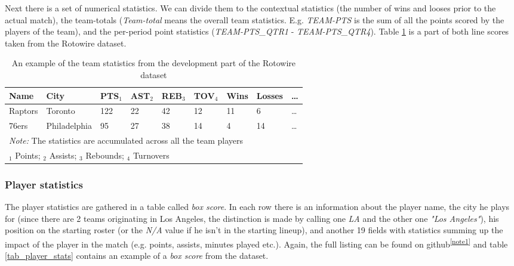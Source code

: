 Next there is a set of numerical statistics. We can divide them to the contextual statistics (the number of wins and looses prior to the actual match), the team-totals (\emph{Team-total} means the overall team statistics. E.g. \emph{TEAM-PTS} is the sum of all the points scored by the players of the team), and the per-period point statistics (\emph{TEAM-PTS\_QTR1} - \emph{TEAM-PTS\_QTR4}). Table \ref{tab_team_stats} is a part of both line scores taken from the Rotowire dataset.

\begin{table}[bh!]
    \centering
    \begin{tabular}{lllllllll}
        \toprule
        Name    & City         & PTS$_1$ & AST$_2$ & REB$_3$ & TOV$_4$ & Wins & Losses  &\dots \\
        \midrule
        Raptors & Toronto      & 122 & 22  & 42  & 12  & 11   & 6       &\dots \\
        76ers   & Philadelphia & 95  & 27  & 38  & 14  & 4    & 14     &\dots \\
        \bottomrule
        \multicolumn{9}{l}{\footnotesize \textit{Note:} The statistics are accumulated across all the team players} \\
        \multicolumn{9}{l}{\footnotesize $_1$ Points; $_2$ Assists; $_3$ Rebounds; $_4$ Turnovers}    \end{tabular}
    \caption{\centering An example of the team statistics from the development part of the Rotowire dataset} \label{tab_team_stats}
\end{table}

\subsubsection{Player statistics}

The player statistics are gathered in a table called \emph{box score}. In each row there is an information about the player name, the city he plays for (since there are 2 teams originating in Los Angeles, the distinction is made by calling one \emph{LA} and the other one \emph{"Los Angeles"}), his position on the starting roster (or the \emph{N/A} value if he isn't in the starting lineup), and another 19 fields with statistics summing up the impact of the player in the match (e.g. points, assists, minutes played etc.). Again, the full listing can be found on github\textsuperscript{\ref{note1}} and table \ref{tab_player_stats} contains an example of a \emph{box score} from the dataset.

